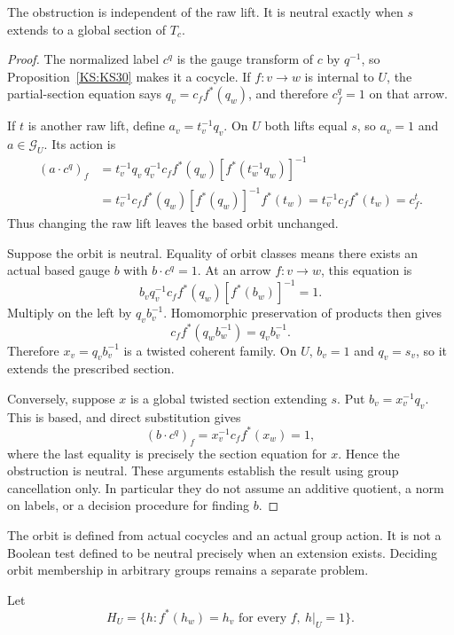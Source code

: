 \begin{KStheorem}\label{KS:KS31}
The obstruction is independent of the raw lift. It is neutral exactly when \(s\) extends to a global section of \(T_c\).
\end{KStheorem}
\begin{proof}
The normalized label $c^q$ is the gauge transform of $c$ by $q^{-1}$, so Proposition~\ref{KS:KS30} makes it a cocycle. If $f:v\to w$ is internal to $U$, the partial-section equation says $q_v=c_ff^*(q_w)$, and therefore $c_f^q=1$ on that arrow.

If $t$ is another raw lift, define $a_v=t_v^{-1}q_v$. On $U$ both lifts equal $s$, so $a_v=1$ and $a\in\mathcal G_U$. Its action is
\[
\begin{aligned}
 (a\cdot c^q)_f
 &=t_v^{-1}q_v\,q_v^{-1}c_ff^*(q_w)
       [f^*(t_w^{-1}q_w)]^{-1}\\
 &=t_v^{-1}c_ff^*(q_w)
       [f^*(q_w)]^{-1}f^*(t_w)
 =t_v^{-1}c_ff^*(t_w)=c_f^t.
\end{aligned}
\]
Thus changing the raw lift leaves the based orbit unchanged.

Suppose the orbit is neutral. Equality of orbit classes means there exists an actual based gauge $b$ with $b\cdot c^q=1$. At an arrow $f:v\to w$, this equation is
\[
 b_vq_v^{-1}c_ff^*(q_w)[f^*(b_w)]^{-1}=1.
\]
Multiply on the left by $q_vb_v^{-1}$. Homomorphic preservation of products then gives
\[
 c_ff^*(q_wb_w^{-1})=q_vb_v^{-1}.
\]
Therefore $x_v=q_vb_v^{-1}$ is a twisted coherent family. On $U$, $b_v=1$ and $q_v=s_v$, so it extends the prescribed section.

Conversely, suppose $x$ is a global twisted section extending $s$. Put $b_v=x_v^{-1}q_v$. This is based, and direct substitution gives
\[
 (b\cdot c^q)_f
 =x_v^{-1}c_ff^*(x_w)=1,
\]
where the last equality is precisely the section equation for $x$. Hence the obstruction is neutral. These arguments establish the result using group cancellation only. In particular they do not assume an additive quotient, a norm on labels, or a decision procedure for finding $b$.
\end{proof}
The orbit is defined from actual cocycles and an actual group action. It is not a Boolean test defined to be neutral precisely when an extension exists. Deciding orbit membership in arbitrary groups remains a separate problem.

Let
\[
 H_U=\{h:f^*(h_w)=h_v\text{ for every }f,\ h|_U=1\}.
\]

